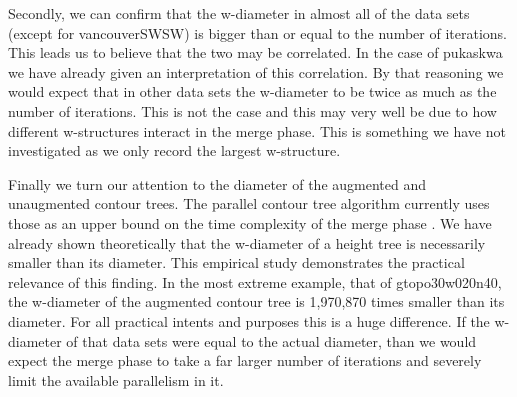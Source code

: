 Secondly, we can confirm that the w-diameter in almost all of the data sets (except for vancouverSWSW) is bigger than or equal to the number of iterations. This leads us to believe that the two may be correlated. In the case of pukaskwa we have already given an interpretation of this correlation. By that reasoning we would expect that in other data sets the w-diameter to be twice as much as the number of iterations. This is not the case and this may very well be due to how different w-structures interact in the merge phase. This is something we have not investigated as we only record the largest w-structure.


Finally we turn our attention to the diameter of the augmented and unaugmented contour trees. The parallel contour tree algorithm currently uses those as an upper bound on the time complexity of the merge phase \cite{parallel-peak-pruning}. We have already shown theoretically that the w-diameter of a height tree is necessarily smaller than its diameter. This empirical study demonstrates the practical relevance of this finding. In the most extreme example, that of gtopo30w020n40, the w-diameter of the augmented contour tree is 1,970,870 times smaller than its diameter. For all practical intents and purposes this is a huge difference. If the w-diameter of that data sets were equal to the actual diameter, than we would expect the merge phase to take a far larger number of iterations and severely limit the available parallelism in it.

